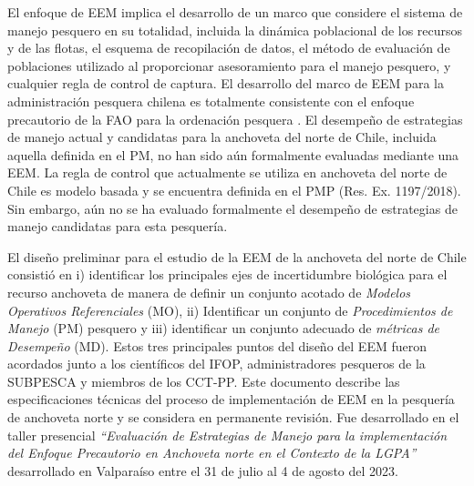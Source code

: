 El enfoque de EEM implica el desarrollo de un marco que considere el sistema de manejo pesquero en su totalidad, incluida la dinámica poblacional de los recursos y de las flotas, el esquema de recopilación de datos, el método de evaluación de poblaciones utilizado al proporcionar asesoramiento para el manejo pesquero, y cualquier regla de control de captura. El desarrollo del marco de EEM para la administración pesquera chilena es totalmente consistente con el enfoque precautorio de la FAO para la ordenación pesquera \citep{tsukamoto2008refocusing}. El desempeño de estrategias de manejo actual y candidatas para la anchoveta del norte de Chile, incluida aquella definida en el PM, no han sido aún formalmente evaluadas mediante una EEM. La regla de control que actualmente se utiliza en anchoveta del norte de Chile es modelo basada \citep{rademeyer2007tips} y se encuentra definida en el PMP (Res. Ex. 1197/2018). Sin embargo, aún no se ha evaluado formalmente el desempeño de estrategias de manejo candidatas para esta pesquería.
\newline

El diseño preliminar para el estudio de la EEM de la anchoveta del norte de Chile consistió en i) identificar los principales ejes de incertidumbre biológica para el recurso anchoveta de manera de definir un conjunto acotado de \textit{Modelos Operativos Referenciales} (MO), ii) Identificar un conjunto de \textit{Procedimientos de Manejo} (PM) pesquero y iii) identificar un conjunto adecuado de \textit{métricas de Desempeño} (MD). Estos tres principales puntos del diseño del EEM fueron acordados junto a los científicos del IFOP, administradores pesqueros de la SUBPESCA y miembros de los CCT-PP. Este documento describe las especificaciones técnicas del proceso de implementación de EEM en la pesquería de anchoveta norte y se considera en permanente revisión. Fue desarrollado en el taller presencial \textit{“Evaluación de Estrategias de Manejo para la implementación del Enfoque Precautorio en Anchoveta norte en el Contexto de la LGPA”} desarrollado en Valparaíso entre el 31 de julio al 4 de agosto del 2023.


